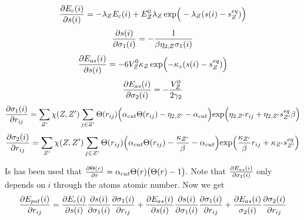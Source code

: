 \documentclass[a4paper,12pt]{article}
\begin{document}
\begin{equation}
  {\partial E_c(i) \over \partial s(i)} = - \lambda_Z E_c(i) + E^0_Z
  \lambda_Z \exp \Bigr( -\lambda_Z (s(i) - s^{eq}_Z) \Bigr)
\end{equation}
\begin{equation}
  {\partial s(i) \over \partial \sigma_1(i)} = - {1 \over \beta \eta_{2,Z}
    \sigma_1(i)} 
\end{equation}
\begin{equation}
  {\partial E_{as}(i) \over \partial s(i)} = - 6 V^0_Z \kappa_Z \exp \Bigl(
  - \kappa_z (s(i) - s^{eq}_Z) \Bigr)
\end{equation}
\begin{equation}
  {\partial E_{as}(i) \over \partial \sigma_2(i)} = - {V^0_Z \over 2 \gamma_2}
\end{equation}
\begin{equation}
  {\partial \sigma_1(i) \over \partial r_{ij}} = \sum_{Z'} \chi(Z, Z')
  \sum_{j \in Z'} \Theta(r_{ij}) \Bigr( \alpha_{cut} \Theta(r_{ij}) -
  \eta_{2,Z'} - \alpha_{cut} \Bigl) \exp \Bigr( \eta_{2,Z'} r_{ij} +
  \eta_{2,Z'} s^{eq}_{Z'} \beta \Bigr) 
\end{equation}
\begin{equation}
  {\partial \sigma_2(i) \over \partial r_{ij}} = \sum_{Z'} \chi(Z, Z')
  \sum_{j \in Z'} \Theta(r_{ij}) \Bigr( \alpha_{cut} \Theta(r_{ij}) -
  {\kappa_{Z'} \over \beta} - \alpha_{cut} \Bigl) \exp \Bigr(
  {\kappa_{Z'} \over \beta} r_{ij} +
  \kappa_{Z'} s^{eq}_{Z'} \Bigr) 
\end{equation}

 Is has been used that ${\partial \Theta(r) \over \partial r} =
\alpha_{cut} \Theta(r) \bigr(\Theta(r) - 1\bigl)$.  Note that
$\partial E_{as}(i) \over \partial \sigma_2(i)$ only depends on $i$
through the atoms atomic number.  Now we get
\begin{equation}
  \label{ederiv}
  {\partial E_{pot}(i) \over \partial r_{ij}} = {\partial E_c(i) \over
    \partial s(i)} {\partial s(i) \over \partial \sigma_1(i)}
  {\partial \sigma_1(i) \over \partial r_{ij}} + {\partial E_{as}(i)
    \over \partial s(i)} {\partial s(i) \over \partial \sigma_1(i)}
  {\partial \sigma_1(i) \over \partial r_{ij}} + {\partial E_{as}(i)
    \over \sigma_2(i)} {\partial \sigma_2(i) \over \partial r_{ij}}
\end{equation}
\end{document}
